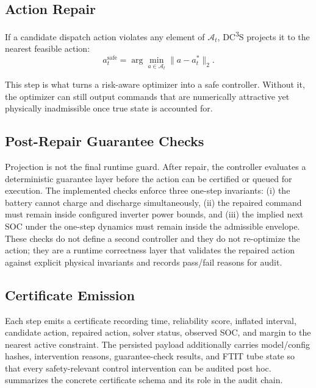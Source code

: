 \documentclass[11pt,a4paper]{article}
\begin{document}
\subsection{Action Repair}

If a candidate dispatch action violates any element of $\mathcal{A}_t$, DC\textsuperscript{3}S projects it to the nearest feasible action:
\begin{equation}\label{eq:projection}
  a_t^{\mathrm{safe}} = \arg\min_{a \in \mathcal{A}_t}\|a-a_t^{*}\|_2.
\end{equation}

This step is what turns a risk-aware optimizer into a safe controller. Without it, the optimizer can still output commands that are numerically attractive yet physically inadmissible once true state is accounted for.

\subsection{Post-Repair Guarantee Checks}

Projection is not the final runtime guard. After repair, the controller evaluates a deterministic guarantee layer before the action can be certified or queued for execution. The implemented checks enforce three one-step invariants: (i) the battery cannot charge and discharge simultaneously, (ii) the repaired command must remain inside configured inverter power bounds, and (iii) the implied next SOC under the one-step dynamics must remain inside the admissible envelope. These checks do not define a second controller and they do not re-optimize the action; they are a runtime correctness layer that validates the repaired action against explicit physical invariants and records pass/fail reasons for audit.

\subsection{Certificate Emission}

Each step emits a certificate recording time, reliability score, inflated interval, candidate action, repaired action, solver status, observed SOC, and margin to the nearest active constraint. The persisted payload additionally carries model/config hashes, intervention reasons, guarantee-check results, and FTIT tube state so that every safety-relevant control intervention can be audited post hoc.  summarizes the concrete certificate schema and its role in the audit chain.
\end{document}
